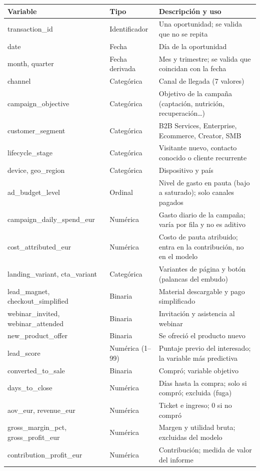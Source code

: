\documentclass[11pt,letterpaper]{article}
\begin{document}
\begin{table}[!htbp]
\centering\small
\begin{tabularx}{\linewidth}{>{\ttfamily}l l L}
\toprule
\normalfont Variable & Tipo & Descripción y uso \\
\midrule
transaction\_id & Identificador & Una oportunidad; se valida que no se repita \\
date & Fecha & Día de la oportunidad \\
month, quarter & Fecha derivada & Mes y trimestre; se valida que coincidan con la fecha \\
channel & Categórica & Canal de llegada (7 valores) \\
campaign\_objective & Categórica & Objetivo de la campaña (captación, nutrición, recuperación\ldots) \\
customer\_segment & Categórica & B2B Services, Enterprise, Ecommerce, Creator, SMB \\
lifecycle\_stage & Categórica & Visitante nuevo, contacto conocido o cliente recurrente \\
device, geo\_region & Categórica & Dispositivo y país \\
ad\_budget\_level & Ordinal & Nivel de gasto en pauta (bajo a saturado); solo canales pagados \\
campaign\_daily\_spend\_eur & Numérica & Gasto diario de la campaña; varía por fila y no es aditivo \\
cost\_attributed\_eur & Numérica & Costo de pauta atribuido; entra en la contribución, no en el modelo \\
landing\_variant, cta\_variant & Categórica & Variantes de página y botón (palancas del embudo) \\
lead\_magnet, checkout\_simplified & Binaria & Material descargable y pago simplificado \\
webinar\_invited, webinar\_attended & Binaria & Invitación y asistencia al webinar \\
new\_product\_offer & Binaria & Se ofreció el producto nuevo \\
lead\_score & Numérica (1--99) & Puntaje previo del interesado; la variable más predictiva \\
converted\_to\_sale & Binaria & Compró; variable objetivo \\
days\_to\_close & Numérica & Días hasta la compra; solo si compró; excluida (fuga) \\
aov\_eur, revenue\_eur & Numérica & Ticket e ingreso; 0 si no compró \\
gross\_margin\_pct, gross\_profit\_eur & Numérica & Margen y utilidad bruta; excluidas del modelo \\
contribution\_profit\_eur & Numérica & Contribución; medida de valor del informe \\
\bottomrule
\end{tabularx}
\end{table}
\end{document}

